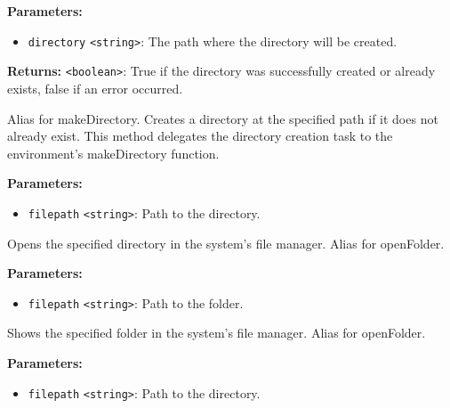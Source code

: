 \documentclass[12pt,a4paper]{article}
\begin{document}
\noindent \textbf{Parameters:}
\begin{itemize}
  \item \texttt{directory} \texttt{<string>}: The path where the directory will be created.
\end{itemize}

\noindent \textbf{Returns:} \texttt{<boolean>}: True if the directory was successfully created or already exists, false if an error occurred.

\noindent Alias for makeDirectory. Creates a directory at the specified path if it does not already exist.
This method delegates the directory creation task to the environment's makeDirectory function.

\vspace{5mm}
\noindent {}


\noindent \textbf{Parameters:}
\begin{itemize}
  \item \texttt{filepath} \texttt{<string>}: Path to the directory.
\end{itemize}

\noindent Opens the specified directory in the system's file manager. Alias for \textasciigrave{}openFolder\textasciigrave{}.

\vspace{5mm}
\noindent {}


\noindent \textbf{Parameters:}
\begin{itemize}
  \item \texttt{filepath} \texttt{<string>}: Path to the folder.
\end{itemize}

\noindent Shows the specified folder in the system's file manager. Alias for \textasciigrave{}openFolder\textasciigrave{}.

\vspace{5mm}
\noindent {}


\noindent \textbf{Parameters:}
\begin{itemize}
  \item \texttt{filepath} \texttt{<string>}: Path to the directory.
\end{itemize}
\end{document}
